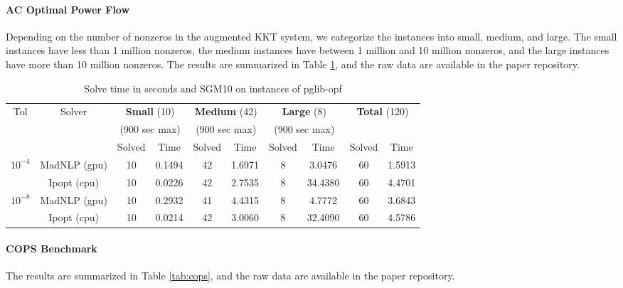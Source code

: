 \documentclass{article}
\begin{document}
\paragraph{AC Optimal Power Flow}
Depending on the number of nonzeros in the augmented KKT system, we categorize the instances into small, medium, and large. The small instances have less than 1 million nonzeros, the medium instances have between 1 million and 10 million nonzeros, and the large instances have more than 10 million nonzeros. The results are summarized in Table \ref{tab:pglib-opf}, and the raw data are available in the paper repository.

\begin{table}[t]
  \centering\footnotesize
  \caption{Solve time in seconds and SGM10 on instances of pglib-opf}\label{tab:pglib-opf}
  \begin{tabular}{|c|c|cc|cc|cc|cc|}
    \hline
    \multirow{ 3}{*}{Tol} & \multirow{ 3}{*}{Solver} & \multicolumn{2}{c|}{\textbf{Small} (10)}& \multicolumn{2}{c|}{\textbf{Medium} (42)}& \multicolumn{2}{c|}{\textbf{Large} (8)}& \multicolumn{2}{c|}{\multirow{2}{*}{\textbf{Total} (120)}}\\
                          && \multicolumn{2}{c|}{(900 sec max)}& \multicolumn{2}{c|}{(900 sec max)}& \multicolumn{2}{c|}{(900 sec max)}&&\\
                          &&  Solved & Time &  Solved & Time &  Solved & Time &  Solved & Time \\
    \hline
    \multirow{2}{*}{$10^{-4}$} & MadNLP (gpu) & 10 & 0.1494 & 42 & 1.6971 & 8 & 3.0476 & 60 & 1.5913  \\
                          & Ipopt (cpu) & 10 & 0.0226 & 42 & 2.7535 & 8 & 34.4380 & 60 & 4.4701  \\

    \hline
    \multirow{2}{*}{$10^{-8}$} & MadNLP (gpu) & 10 & 0.2932 & 41 & 4.4315 & 8 & 4.7772 & 60 & 3.6843  \\
                          & Ipopt (cpu) & 10 & 0.0214 & 42 & 3.0060 & 8 & 32.4090 & 60 & 4.5786  \\

    \hline
  \end{tabular}
\end{table}


\paragraph{COPS Benchmark}
The results are summarized in Table \ref{tab:cops}, and the raw data are available in the paper repository.
\end{document}
